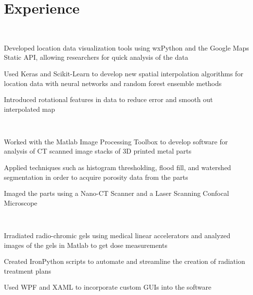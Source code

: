 \documentclass[]{deedy-resume-openfont}
\begin{document}
\hfill
\begin{minipage}[t]{0.66\textwidth} 


\section{Experience}

\\
\vspace{\topsep} %
\begin{tightemize}
\item Developed location data visualization tools using wxPython and the Google Maps Static API, allowing researchers for quick analysis of the data
\item Used Keras and Scikit-Learn to develop new spatial interpolation algorithms for location data with neural networks and random forest ensemble methods 
\item Introduced rotational features in data to reduce error and smooth out interpolated map

\end{tightemize}
\sectionsep

\\
\begin{tightemize}
\item Worked with the Matlab Image Processing Toolbox to develop software for analysis of CT scanned image stacks of 3D printed metal parts
\item Applied techniques such as histogram thresholding, flood fill, and watershed segmentation in order to acquire porosity data from the parts
\item Imaged the parts using a Nano-CT Scanner and a Laser Scanning Confocal Microscope
\end{tightemize}
\sectionsep

\\
\begin{tightemize}
\item Irradiated radio-chromic gels using medical linear accelerators and analyzed images of the gels in Matlab to get dose measurements 
\item Created IronPython scripts to automate and streamline the creation of radiation treatment plans
\item Used WPF and XAML to incorporate custom GUIs into the software
\end{tightemize}
\sectionsep


\end{minipage}
\end{document}
